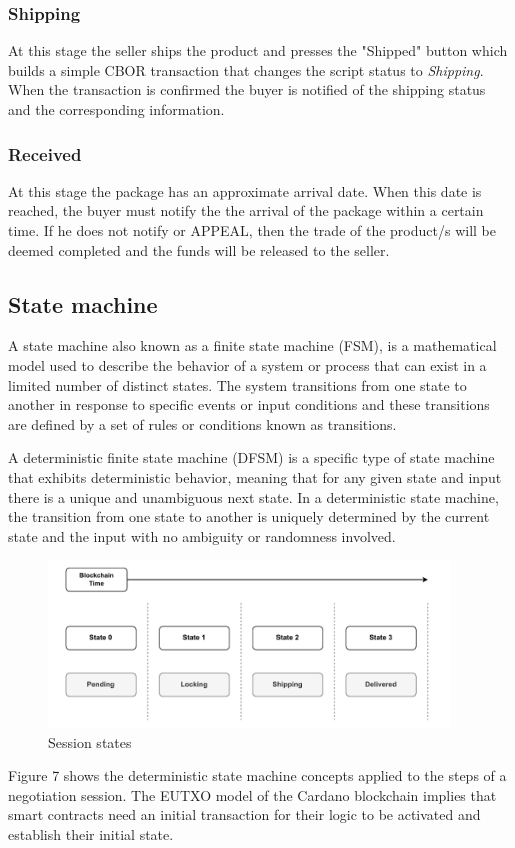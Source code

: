\documentclass[12pt]{article}
\begin{document}
\subsubsection { Shipping }

At this stage the seller ships the product and presses the "Shipped" button which builds a simple CBOR transaction that changes the script status to \emph{Shipping}. When the transaction is confirmed the buyer is notified of the shipping status and the corresponding information.

\subsubsection { Received }

At this stage the package has an approximate arrival date. When this date is reached, the buyer must notify the  the arrival of the package within a certain time. If he does not notify or APPEAL, then the trade of the product/s will be deemed completed and the funds will be released to the seller.

\subsection { State machine }
A state machine also known as a finite state machine (FSM), is a mathematical model used to describe the behavior of a system or process that can exist in a limited number of distinct states. The system transitions from one state to another in response to specific events or input conditions and these transitions are defined by a set of rules or conditions known as transitions.

A deterministic finite state machine (DFSM) is a specific type of state machine that exhibits deterministic behavior, meaning that for any given state and input there is a unique and unambiguous next state. In a deterministic state machine, the transition from one state to another is uniquely determined by the current state and the input with no ambiguity or randomness involved.

\begin{figure}[ht]
  \centering
  \includegraphics[width=0.95\textwidth]{machine.pdf}
  \caption{Session states}
  \label{fig:States}
\end{figure}
Figure 7 shows the deterministic state machine concepts applied to the steps of a negotiation session. 
The EUTXO model of the Cardano blockchain implies that smart contracts need an initial transaction for their logic to be activated and establish their initial state.
\end{document}
